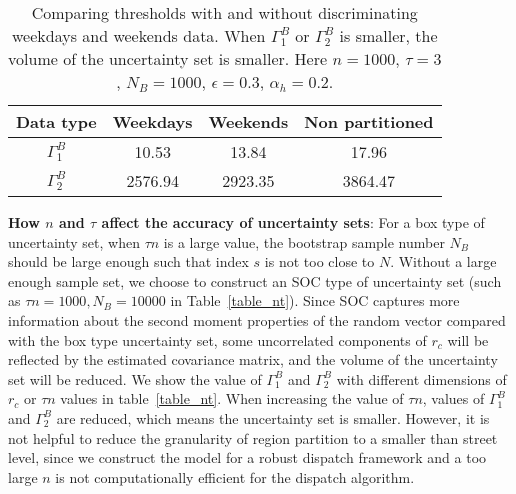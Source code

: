 \documentclass[10pt,twocolumn,twoside,english]{IEEEtran}
\begin{document}
\begin{table}[t!]
\centering
\begin{tabular}{|c|c|c|c|}
  \hline
Data type& Weekdays & Weekends &Non partitioned\\ \hline
$\Gamma_1^B$ &10.53        &13.84          & 17.96   \\ \hline
 $\Gamma_2^B$ & 2576.94   &2923.35  &3864.47    \\ \hline
\end{tabular}
     \caption{Comparing thresholds with and without discriminating weekdays and weekends data. When $\Gamma_1^B$ or $\Gamma_2^B$ is smaller, the volume of the uncertainty set is smaller. Here $n=1000$, $\tau =3$, $N_B=1000$, $\epsilon=0.3$, $\alpha_h=0.2$.}
     \label{table_sepa}
  \vspace{-20pt}
\end{table}


\textbf{How $n$ and $\tau$ affect the accuracy of uncertainty sets}:
For a box type of uncertainty set, when $\tau n$ is a large value, the bootstrap sample number $N_B$ should be large enough such that index $s$ is not too close to $N$. Without a large enough sample set, we choose to construct an SOC type of uncertainty set (such as $\tau n=1000,  N_B=10000$ in Table~\ref{table_nt}). Since SOC captures more information about the second moment properties of the random vector compared with the box type uncertainty set, some uncorrelated components of $r_c$ will be reflected by the estimated covariance matrix, and the volume of the uncertainty set will be reduced. We show the value of $\Gamma_1^B$ and $\Gamma_2^B$ with different dimensions of $r_c$ or $\tau n$ values in table~\ref{table_nt}. When increasing the value of $\tau n$, values of $\Gamma_1^B$ and $\Gamma_2^B$ are reduced, which means the uncertainty set is smaller. However, it is not helpful to reduce the granularity of region partition to a smaller than street level, since we construct the model for a robust dispatch framework and a too large $n$ is not computationally efficient for the dispatch algorithm.
\end{document}
